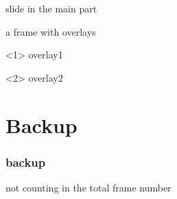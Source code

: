 \documentclass[t]{beamer}
\begin{document}
    \begin{frame}
        slide in the main part
    \end{frame}

    \begin{frame}
        a frame with overlays
        \begin{onlyenv}<1>
            overlay1
        \end{onlyenv}
        \begin{onlyenv}<2>
            overlay2
        \end{onlyenv}
    \end{frame}

    \appendix
    \section*{Backup}

    \begin{frame}
        \frametitle{backup}
        not counting in the total frame number
    \end{frame}
\end{document}
